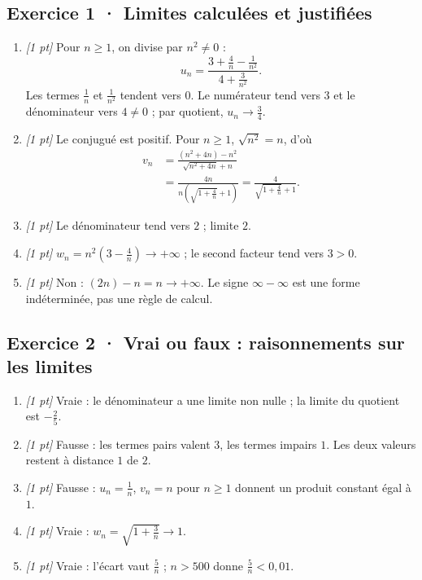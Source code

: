 \subsection*{Exercice 1 · Limites calculées et justifiées}\begin{enumerate}

\item \textit{[1 pt]} Pour $n\ge1$, on divise par $n^2\ne0$ :
\[u_n=\frac{3+\frac{4}{n}-\frac{1}{n^2}}{4+\frac{3}{n^2}}.\]
Les termes $\frac{1}{n}$ et $\frac{1}{n^2}$ tendent vers $0$. Le numérateur tend vers $3$ et le dénominateur vers $4\ne0$ ; par quotient, $u_n\to\frac{3}{4}$.

\item \textit{[1 pt]} Le conjugué est positif. Pour $n\ge1$, $\sqrt{n^2}=n$, d'où
\[\begin{aligned}v_n&=\frac{(n^2+4n)-n^2}{\sqrt{n^2+4n}+n}\\&=\frac{4n}{n(\sqrt{1+\frac{4}{n}}+1)}=\frac{4}{\sqrt{1+\frac{4}{n}}+1}.\end{aligned}\]

\item \textit{[1 pt]} Le dénominateur tend vers $2$ ; limite $2$.

\item \textit{[1 pt]} $w_n=n^2(3-\frac{4}{n})\to+\infty$ ; le second facteur tend vers $3>0$.

\item \textit{[1 pt]} Non : $(2n)-n=n\to+\infty$. Le signe $\infty-\infty$ est une forme indéterminée, pas une règle de calcul.

\end{enumerate}

\subsection*{Exercice 2 · Vrai ou faux : raisonnements sur les limites}\begin{enumerate}

\item \textit{[1 pt]} Vraie : le dénominateur a une limite non nulle ; la limite du quotient est $-\frac{2}{5}$.

\item \textit{[1 pt]} Fausse : les termes pairs valent $3$, les termes impairs $1$. Les deux valeurs restent à distance $1$ de $2$.

\item \textit{[1 pt]} Fausse : $u_n=\frac{1}{n}$, $v_n=n$ pour $n\ge1$ donnent un produit constant égal à $1$.

\item \textit{[1 pt]} Vraie : $w_n=\sqrt{1+\frac{3}{n}}\to1$.

\item \textit{[1 pt]} Vraie : l'écart vaut $\frac{5}{n}$ ; $n>500$ donne $\frac{5}{n}<0{,}01$.

\end{enumerate}

